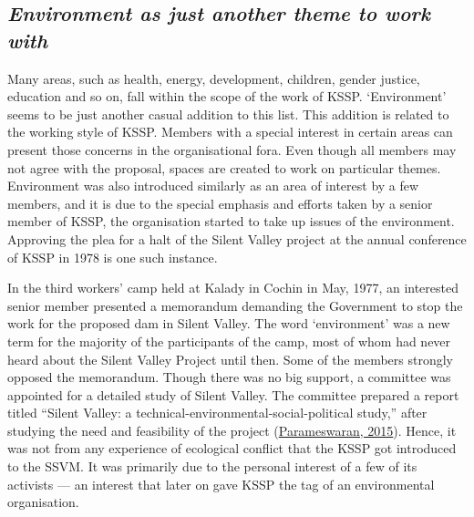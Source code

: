 \documentclass[twoside, 13pt]{article}
\begin{document}
{{{\vspace{-.2cm}

{\fontsize{8}{10}\selectfont\subsection*{\textit{Environment as just another theme to work with}}}

{\fontsize{12}{14}\selectfont Many areas, such as health, energy, development, children, gender justice, education and so on, fall within the scope of the work of KSSP. ‘Environment’ seems to be just another casual addition to this list. This addition is related to the working style of KSSP. Members with a special interest in certain areas can present those concerns in the organisational fora. Even though all members may not agree with the proposal, spaces are created to work on particular themes. Environment was also introduced similarly as an area of interest by a few members, and it is due to the special emphasis and efforts taken by a senior member of KSSP, the organisation started to take up issues of the environment. Approving the plea for a halt of the Silent Valley project at the annual conference of KSSP in 1978 is one such instance.

In the third workers’ camp held at Kalady in Cochin in May, 1977, an interested senior member presented a memorandum demanding the Government to stop the work for the proposed dam in Silent Valley. The word ‘environment’ was a new term for the majority of the participants of the camp, most of whom had never heard about the Silent Valley Project until then. Some of the members strongly opposed the memorandum. Though there was no big support, a committee was appointed for a detailed study of Silent Valley. The committee prepared a report titled “Silent Valley: a technical-environmental-social-political study,” after studying the need and feasibility of the project (\underline{Parameswaran, 2015}). Hence, it was not from any experience of ecological conflict that the KSSP got introduced to the SSVM. It was primarily due to the personal interest of a few of its activists — an interest that later on gave KSSP the tag of an environmental organisation.}

\vspace{-.5cm}

}}}
\end{document}
